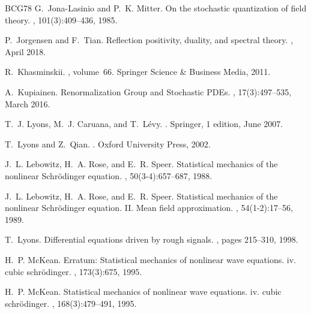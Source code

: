 \documentclass[a4paper,11pt]{article}
\numberwithin{equation}{section}
\begin{document}
\begin{thebibliography}{BCG{\etalchar{+}}78}
G.~Jona-Lasinio and P.~K. Mitter.
\newblock On the stochastic quantization of field theory.
,
  101(3):409--436, 1985.

P.~Jorgensen and F.~Tian.
\newblock Reflection positivity, duality, and spectral theory.
, April 2018.

R.~Khasminskii.
, volume~66.
\newblock Springer Science \& Business Media, 2011.

A.~Kupiainen.
\newblock Renormalization {Group} and {Stochastic} {PDEs}.
, 17(3):497--535, March 2016.

T.~J. Lyons, M.~J. Caruana, and T.~L\'evy.
.
\newblock Springer, 1 edition, June 2007.

T.~Lyons and Z.~Qian.
.
\newblock Oxford University Press, 2002.

J.~L. Lebowitz, H.~A. Rose, and E.~R. Speer.
\newblock Statistical mechanics of the nonlinear {Schr\"odinger} equation.
, 50(3-4):657--687, 1988.

J.~L. Lebowitz, H.~A. Rose, and E.~R. Speer.
\newblock Statistical mechanics of the nonlinear {Schr\"odinger} equation.
  {II}. {Mean} field approximation.
, 54(1-2):17--56, 1989.

T.~Lyons.
\newblock Differential equations driven by rough signals.
, pages 215--310, 1998.

H.~P. McKean.
\newblock Erratum: Statistical mechanics of nonlinear wave equations. iv. cubic
  schr\"odinger.
, 173(3):675, 1995.

H.~P. McKean.
\newblock Statistical mechanics of nonlinear wave equations. iv. cubic
  schr\"odinger.
, 168(3):479--491, 1995.


\end{thebibliography}
\end{document}
